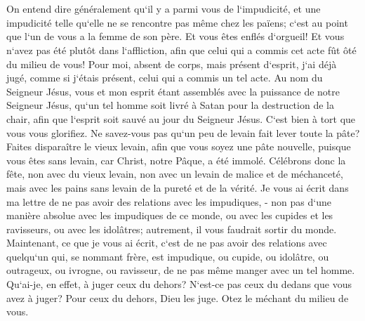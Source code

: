 \chapter{}

\verse On entend dire généralement qu`il y a parmi vous de l`impudicité, et une impudicité telle qu`elle ne se rencontre pas même chez les païens; c`est au point que l`un de vous a la femme de son père. 
\verse Et vous êtes enflés d`orgueil! Et vous n`avez pas été plutôt dans l`affliction, afin que celui qui a commis cet acte fût ôté du milieu de vous! 
\verse Pour moi, absent de corps, mais présent d`esprit, j`ai déjà jugé, comme si j`étais présent, celui qui a commis un tel acte. 
\verse Au nom du Seigneur Jésus, vous et mon esprit étant assemblés avec la puissance de notre Seigneur Jésus, 
\verse qu`un tel homme soit livré à Satan pour la destruction de la chair, afin que l`esprit soit sauvé au jour du Seigneur Jésus. 
\verse C`est bien à tort que vous vous glorifiez. Ne savez-vous pas qu`un peu de levain fait lever toute la pâte? 
\verse Faites disparaître le vieux levain, afin que vous soyez une pâte nouvelle, puisque vous êtes sans levain, car Christ, notre Pâque, a été immolé. 
\verse Célébrons donc la fête, non avec du vieux levain, non avec un levain de malice et de méchanceté, mais avec les pains sans levain de la pureté et de la vérité. 
\verse Je vous ai écrit dans ma lettre de ne pas avoir des relations avec les impudiques, - 
\verse non pas d`une manière absolue avec les impudiques de ce monde, ou avec les cupides et les ravisseurs, ou avec les idolâtres; autrement, il vous faudrait sortir du monde. 
\verse Maintenant, ce que je vous ai écrit, c`est de ne pas avoir des relations avec quelqu`un qui, se nommant frère, est impudique, ou cupide, ou idolâtre, ou outrageux, ou ivrogne, ou ravisseur, de ne pas même manger avec un tel homme. 
\verse Qu`ai-je, en effet, à juger ceux du dehors? N`est-ce pas ceux du dedans que vous avez à juger? 
\verse Pour ceux du dehors, Dieu les juge. Otez le méchant du milieu de vous. 

\chapter{}

